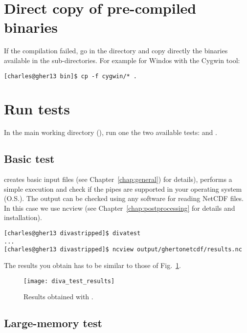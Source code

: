 \section{Direct copy of pre-compiled binaries}

If the compilation failed, go in the  directory and copy directly the binaries available in the sub-directories. For example for Windos with the Cygwin tool:
\begin{lstlisting}[style=Bash]
[charles@gher13 bin]$ cp -f cygwin/* .
\end{lstlisting}

\section{Run tests}

In the main working directory (), run one the two available tests:  and . 


\subsection{Basic test}

 creates basic input files (see Chapter~\ref{chap:general}) for details), performs a simple \diva execution and check if the pipes are supported in your operating system (O.S.). The output can be checked using any software for reading NetCDF files. In this case we use ncview (see Chapter~\ref{chap:postprocessing} for details and installation). 

\begin{lstlisting}[style=Bash]
[charles@gher13 divastripped]$ divatest
...
[charles@gher13 divastripped]$ ncview output/ghertonetcdf/results.nc
\end{lstlisting}
The results you obtain has to be similar to those of Fig.~\ref{fig:diva_test_results}.

\begin{figure}[H]
\centering 
\texttt{[image: diva\_test\_results]}
\caption{Results obtained with .\label{fig:diva_test_results}}
\end{figure}

\subsection{Large-memory test}

